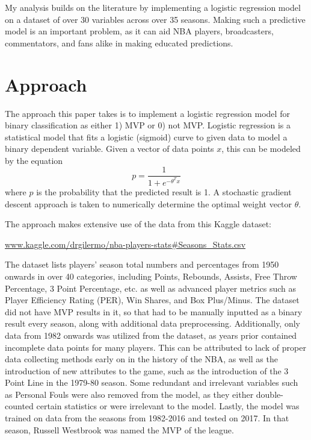 \documentclass{article}
\begin{document}
My analysis builds on the literature by implementing a logistic regression model on a dataset of over 30 variables across over 35 seasons. Making such a predictive model is an important problem, as it can aid NBA players, broadcasters, commentators, and fans alike in making educated predictions.

\section{\Large Approach}
\label{gen_inst}

The approach this paper takes is to implement a logistic regression model for binary classification as either 1) MVP or 0) not MVP. Logistic regression is a statistical model that fits a logistic (sigmoid) curve to given data to model a binary dependent variable. Given a vector of data points $x$, this can be modeled by the equation $$p = \frac{1}{1 + e^{-\theta^T x}}$$ where $p$ is the probability that the predicted result is 1. A stochastic gradient descent approach is taken to numerically determine the optimal weight vector $\theta$.

The approach makes extensive use of the data from this Kaggle dataset:
\begin{center}
	\url{www.kaggle.com/drgilermo/nba-players-stats#Seasons_Stats.csv}
\end{center}

The dataset lists players' season total numbers and percentages from 1950 onwards in over 40 categories, including Points, Rebounds, Assists, Free Throw Percentage, 3 Point Percentage, etc. as well as advanced player metrics such as Player Efficiency Rating (PER), Win Shares, and Box Plus/Minus. The dataset did not have MVP results in it, so that had to be manually inputted as a binary result every season, along with additional data preprocessing. Additionally, only data from 1982 onwards was utilized from the dataset, as years prior contained incomplete data points for many players. This can be attributed to lack of proper data collecting methods early on in the history of the NBA, as well as the introduction of new attributes to the game, such as the introduction of the 3 Point Line in the 1979-80 season. Some redundant and irrelevant variables such as Personal Fouls were also removed from the model, as they either double-counted certain statistics or were irrelevant to the model. Lastly, the model was trained on data from the seasons from 1982-2016 and tested on 2017. In that season, Russell Westbrook was named the MVP of the league.
\end{document}
